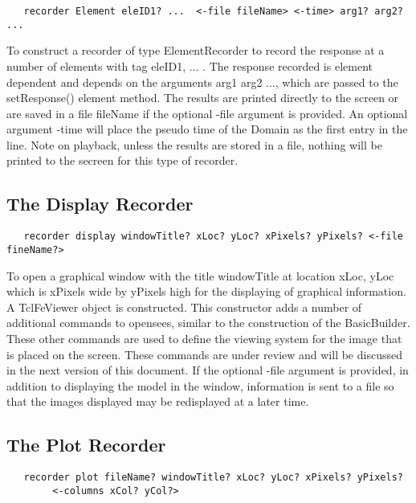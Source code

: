 \documentclass[12pt]{article}
\begin{document}
{\sf\small
\begin{verbatim}
   recorder Element eleID1? ...  <-file fileName> <-time> arg1? arg2? ...
\end{verbatim}
}

\noindent To construct a recorder of type ElementRecorder to record
the response at a number of elements with tag eleID1, ... . The
response recorded is element dependent and depends on the arguments
arg1 arg2 ..., which are passed to the setResponse() element
method. The results are printed directly to the screen or are saved in
a file fileName if the optional -file argument is provided. An
optional argument -time will place the pseudo time of the Domain as
the first entry in the line. Note on playback, unless the results are
stored in a file, nothing will be printed to the secreen for this type
of recorder. 

\subsection{The Display Recorder}

{\sf\small
\begin{verbatim}
   recorder display windowTitle? xLoc? yLoc? xPixels? yPixels? <-file fineName?>
\end{verbatim}
}

\noindent To open a graphical window with the title windowTitle at location
xLoc, yLoc which is xPixels wide by yPixels high for the
displaying of graphical information. A TclFeViewer object is
constructed. This constructor adds a number of additional commands to
opensees, similar to the construction of the BasicBuilder. These other
commands are used to define the viewing system for the image that is
placed on the screen. These commands are under review and will be
discussed in the next version of this document. If the optional -file
argument is provided, in addition to displaying the model in the window,
information is sent to a file so that the images displayed may be
redisplayed at a later time. 

\subsection{The Plot Recorder}

{\sf\small
\begin{verbatim}
   recorder plot fileName? windowTitle? xLoc? yLoc? xPixels? yPixels? 
        <-columns xCol? yCol?>
\end{verbatim}
}
\end{document}
